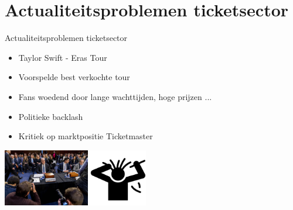 \documentclass{beamer}
\begin{document}
\section[Actualiteitsproblemen]{Actualiteitsproblemen ticketsector}
\begin{frame}{Actualiteitsproblemen ticketsector}
    \begin{itemize}
        \item Taylor Swift - Eras Tour
        \item Voorspelde best verkochte tour
        \item Fans woedend door lange wachttijden, hoge prijzen ...
        \item Politieke backlash
        \item Kritiek op marktpositie Ticketmaster
    \end{itemize}
    \begin{center}
        \includegraphics[height = 2.5cm]{senate-hearing.jpg}
        \includegraphics[height = 2.5cm]{frustratie.png}     
    \end{center}
\end{frame}
\end{document}
